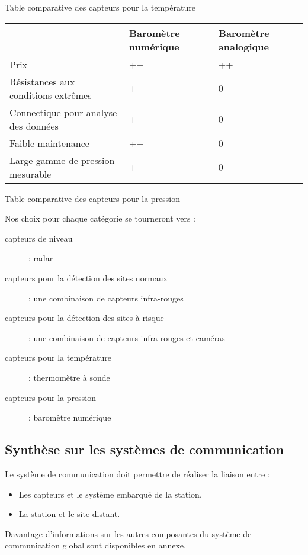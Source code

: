 \documentclass{mise_en_page}
\begin{document}
Table comparative des capteurs pour la température




\begin{flushleft}
\tablehead{}
\begin{supertabular}{|m{5.303cm}|m{5.303cm}|m{5.303cm}|}
\hline
~
 &
Baromètre numérique &
Baromètre analogique\\\hline
Prix &
++ &
++\\\hline
Résistances aux conditions extrêmes &
++ &
0\\\hline
Connectique pour analyse des données &
++ &
0\\\hline
Faible maintenance &
++ &
0\\\hline
Large gamme de pression mesurable &
++ &
0\\\hline
\end{supertabular}
\end{flushleft}



Table comparative des capteurs pour la pression

Nos choix pour chaque catégorie se tourneront vers :

\begin{description}
\item[capteurs de niveau] : radar
\item[capteurs pour la détection des sites normaux] : une combinaison de
capteurs infra-rouges 
\item[capteurs pour la détection des sites à risque] : une combinaison de
capteurs infra-rouges et caméras
\item[capteurs pour la température] : thermomètre à sonde
\item[capteurs pour la pression] : baromètre numérique
\end{description}

\subsection{Synthèse sur les systèmes de communication}
Le système de communication doit permettre de réaliser la liaison entre
:

\begin{itemize}
\item Les capteurs et le système embarqué de la station.
\item La station et le site distant.
\end{itemize}
Davantage d’informations sur les autres composantes du système de
communication global sont disponibles en annexe.
\end{document}

